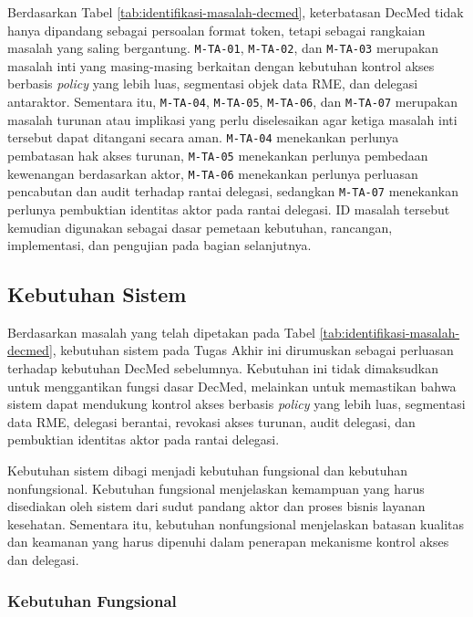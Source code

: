 Berdasarkan Tabel \ref{tab:identifikasi-masalah-decmed}, keterbatasan DecMed tidak hanya dipandang sebagai persoalan format token, tetapi sebagai rangkaian masalah yang saling bergantung. \texttt{M-TA-01}, \texttt{M-TA-02}, dan \texttt{M-TA-03} merupakan masalah inti yang masing-masing berkaitan dengan kebutuhan kontrol akses berbasis \textit{policy} yang lebih luas, segmentasi objek data RME, dan delegasi antaraktor. Sementara itu, \texttt{M-TA-04}, \texttt{M-TA-05}, \texttt{M-TA-06}, dan \texttt{M-TA-07} merupakan masalah turunan atau implikasi yang perlu diselesaikan agar ketiga masalah inti tersebut dapat ditangani secara aman. \texttt{M-TA-04} menekankan perlunya pembatasan hak akses turunan, \texttt{M-TA-05} menekankan perlunya pembedaan kewenangan berdasarkan aktor, \texttt{M-TA-06} menekankan perlunya perluasan pencabutan dan audit terhadap rantai delegasi, sedangkan \texttt{M-TA-07} menekankan perlunya pembuktian identitas aktor pada rantai delegasi. ID masalah tersebut kemudian digunakan sebagai dasar pemetaan kebutuhan, rancangan, implementasi, dan pengujian pada bagian selanjutnya.

\subsection{Kebutuhan Sistem}
\label{subsec:kebutuhan-sistem}

Berdasarkan masalah yang telah dipetakan pada Tabel \ref{tab:identifikasi-masalah-decmed}, kebutuhan sistem pada Tugas Akhir ini dirumuskan sebagai perluasan terhadap kebutuhan DecMed sebelumnya. Kebutuhan ini tidak dimaksudkan untuk menggantikan fungsi dasar DecMed, melainkan untuk memastikan bahwa sistem dapat mendukung kontrol akses berbasis \textit{policy} yang lebih luas, segmentasi data RME, delegasi berantai, revokasi akses turunan, audit delegasi, dan pembuktian identitas aktor pada rantai delegasi.

Kebutuhan sistem dibagi menjadi kebutuhan fungsional dan kebutuhan nonfungsional. Kebutuhan fungsional menjelaskan kemampuan yang harus disediakan oleh sistem dari sudut pandang aktor dan proses bisnis layanan kesehatan. Sementara itu, kebutuhan nonfungsional menjelaskan batasan kualitas dan keamanan yang harus dipenuhi dalam penerapan mekanisme kontrol akses dan delegasi.

\subsubsection{Kebutuhan Fungsional}
\label{subsubsec:kebutuhan-fungsional}

